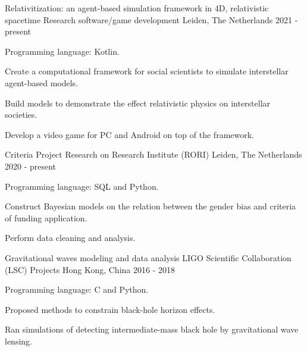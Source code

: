 

\begin{cventries}

  \cventry
    {Relativitization: an agent-based simulation framework in 4D, relativistic spacetime} %
    {Research software/game development} %
    {Leiden, The Netherlands} %
    {2021 - present} %
    {
      \begin{cvitems} %
        \item {Programming language: Kotlin.}
        \item {Create a computational framework for social scientists to simulate interstellar agent-based models.}
        \item {Build models to demonstrate the effect relativistic physics on interstellar societies.}
        \item {Develop a video game for PC and Android on top of the framework.}
      \end{cvitems}
    }

  \cventry
    {Criteria Project} %
    {Research on Research Institute (RORI)} %
    {Leiden, The Netherlands} %
    {2020 - present} %
    {
      \begin{cvitems} %
        \item {Programming language: SQL and Python.}
        \item {Construct Bayesian models on the relation between the gender bias and criteria of funding application.}
        \item {Perform data cleaning and analysis.}
      \end{cvitems}
    }

  \cventry
    {Gravitational waves modeling and data analysis} %
    {LIGO Scientific Collaboration (LSC) Projects} %
    {Hong Kong, China} %
    {2016 - 2018} %
    {
      \begin{cvitems} %
        \item {Programming language: C and Python.}
        \item {Proposed methods to constrain black-hole horizon effects.}
        \item {Ran simulations of detecting intermediate-mass black hole by gravitational wave lensing.}
      \end{cvitems}
    }


\end{cventries}
